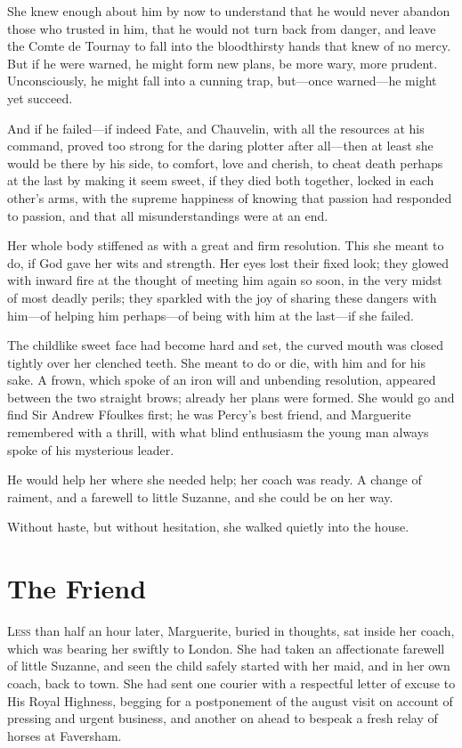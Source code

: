 \documentclass[paper=a5,BCOR=7mm,twoside,DIV=calc,12pt,usegeometry,chapterprefix,endperiod,headings=big]{scrbook}
\begin{document}
She knew enough about him by now to understand that he would never abandon those who trusted in him, that he would not turn back from danger, and leave the Comte de Tournay to fall into the bloodthirsty hands that knew of no mercy. But if he were warned, he might form new plans, be more wary, more prudent. Unconsciously, he might fall into a cunning trap, but---once warned---he might yet succeed.

And if he failed---if indeed Fate, and Chauvelin, with all the resources at his command, proved too strong for the daring plotter after all---then at least she would be there by his side, to comfort, love and cherish, to cheat death perhaps at the last by making it seem sweet, if they died both together, locked in each other's arms, with the supreme happiness of knowing that passion had responded to passion, and that all misunderstandings were at an end.

Her whole body stiffened as with a great and firm resolution. This she meant to do, if God gave her wits and strength. Her eyes lost their fixed look; they glowed with inward fire at the thought of meeting him again so soon, in the very midst of most deadly perils; they sparkled with the joy of sharing these dangers with him---of helping him perhaps---of being with him at the last---if she failed.

The childlike sweet face had become hard and set, the curved mouth was closed tightly over her clenched teeth. She meant to do or die, with him and for his sake. A frown, which spoke of an iron will and unbending resolution, appeared between the two straight brows; already her plans were formed. She would go and find Sir Andrew Ffoulkes first; he was Percy's best friend, and Marguerite remembered with a thrill, with what blind enthusiasm the young man always spoke of his mysterious leader.

He would help her where she needed help; her coach was ready. A change of raiment, and a farewell to little Suzanne, and she could be on her way.

Without haste, but without hesitation, she walked quietly into the house.

\chapter{The Friend}
\lettrine[lines=4]{L}{ess} than half an hour later, Marguerite, buried in thoughts, sat inside her coach, which was bearing her swiftly to London. She had taken an affectionate farewell of little Suzanne, and seen the child safely started with her maid, and in her own coach, back to town. She had sent one courier with a respectful letter of excuse to His Royal Highness, begging for a postponement of the august visit on account of pressing and urgent business, and another on ahead to bespeak a fresh relay of horses at Faversham.
\end{document}
